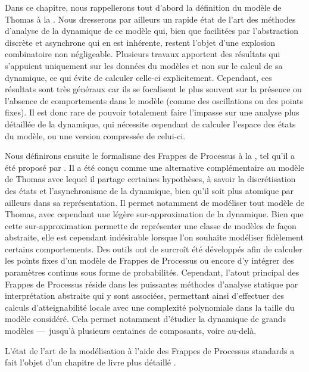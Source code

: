 Dans ce chapitre, nous rappellerons tout d'abord la définition du modèle de Thomas
à la .
Nous dresserons par ailleurs un rapide état de l'art des méthodes d'analyse
de la dynamique de ce modèle qui, bien que facilitées par
l'abstraction discrète et asynchrone qui en est inhérente,
restent l'objet d'une explosion combinatoire non négligeable.
Plusieurs travaux apportent des résultats qui s'appuient uniquement sur les données
du modèles et non sur le calcul de sa dynamique,
ce qui évite de calculer celle-ci explicitement.
Cependant, ces résultats sont très généraux
car ils se focalisent le plus souvent sur la présence ou l'absence de comportements
dans le modèle (comme des oscillations ou des points fixes).
Il est donc rare de pouvoir totalement faire l'impasse
sur une analyse plus détaillée de la dynamique,
qui nécessite cependant de calculer l'espace des états du modèle,
ou une version compressée de celui-ci.

Nous définirons ensuite le formalisme des Frappes de Processus
à la , tel qu'il a été proposé par .
Il a été conçu comme une alternative complémentaire au modèle de Thomas
avec lequel il partage certaines hypothèses, à savoir la discrétisation des états
et l'asynchronisme de la dynamique,
bien qu'il soit plus atomique par ailleurs dans sa représentation.
Il permet notamment de modéliser tout modèle de Thomas,
avec cependant une légère sur-approximation de la dynamique.
Bien que cette sur-approximation permette de représenter une classe de modèles de façon
abstraite, elle est cependant indésirable lorsque l'on souhaite modéliser
fidèlement certains comportements.
Des outils ont de surcroît été développés afin de calculer les points fixes d'un modèle de
Frappes de Processus ou encore d'y intégrer des paramètres continus
sous forme de probabilités.
Cependant, l'atout principal des Frappes de Processus réside dans les puissantes
méthodes d'analyse statique par interprétation abstraite qui y sont associées,
permettant ainsi d'effectuer des calculs d'atteignabilité locale
avec une complexité polynomiale dans la taille du modèle considéré.
Cela permet notamment d'étudier la dynamique de grands modèles
---~jusqu'à plusieurs centaines de composants, voire au-delà.

\myskip

L'état de l'art de la modélisation à l'aide des Frappes de Processus standards
a fait l'objet d'un chapitre de livre plus détaillé \cite*{pauleve14}.









